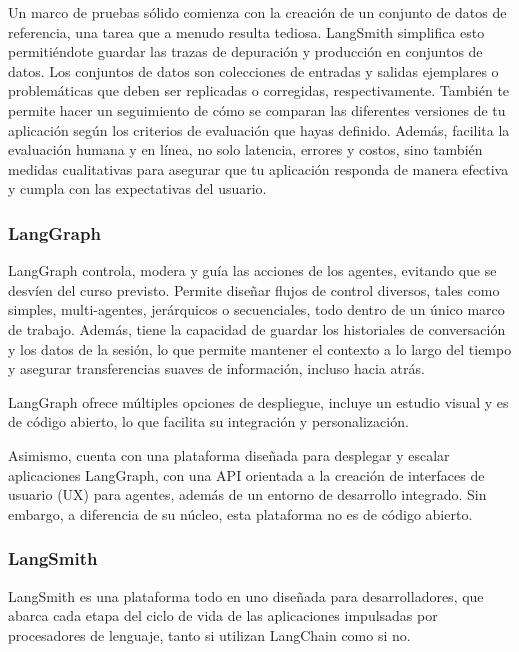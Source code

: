 Un marco de pruebas sólido comienza con la creación de un conjunto de datos de referencia, una tarea que a menudo resulta tediosa. LangSmith simplifica esto permitiéndote guardar las trazas de depuración y producción en conjuntos de datos. Los conjuntos de datos son colecciones de entradas y salidas ejemplares o problemáticas que deben ser replicadas o corregidas, respectivamente. También te permite hacer un seguimiento de cómo se comparan las diferentes versiones de tu aplicación según los criterios de evaluación que hayas definido. Además, facilita la evaluación humana y en línea, no solo latencia, errores y costos, sino también medidas cualitativas para asegurar que tu aplicación responda de manera efectiva y cumpla con las expectativas del usuario. \cite{PaginaLangChainOficialEvaluacion}


 
\subsubsection{LangGraph}

LangGraph controla, modera y guía las acciones de los agentes, evitando que se desvíen del curso previsto. Permite diseñar flujos de control diversos, tales como simples, multi-agentes, jerárquicos o secuenciales, todo dentro de un único marco de trabajo. Además, tiene la capacidad de guardar los historiales de conversación y los datos de la sesión, lo que permite mantener el contexto a lo largo del tiempo y asegurar transferencias suaves de información, incluso hacia atrás.

LangGraph ofrece múltiples opciones de despliegue, incluye un estudio visual y es de código abierto, lo que facilita su integración y personalización.

Asimismo, cuenta con una plataforma diseñada para desplegar y escalar aplicaciones LangGraph, con una API orientada a la creación de interfaces de usuario (UX) para agentes, además de un entorno de desarrollo integrado. Sin embargo, a diferencia de su núcleo, esta plataforma no es de código abierto.\cite{PaginaLangChainOficialLangGraph}


 

\subsubsection{LangSmith}

LangSmith es una plataforma todo en uno diseñada para desarrolladores, que abarca cada etapa del ciclo de vida de las aplicaciones impulsadas por procesadores de lenguaje, tanto si utilizan LangChain como si no.

